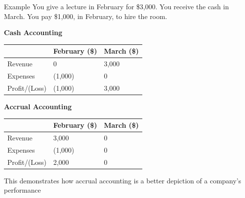 \documentclass{article}
\begin{document}
			\begin{question}{Example}
				You give a lecture in February for \$3,000. You receive the cash in March. You pay \$1,000, in February, to hire the room.

				\textbf{Cash Accounting}
				\begin{table}[H]
					\begin{center}
						\begin{tabular}[c]{p{3cm}|p{4cm}|p{4cm}}
							\hline
							\multicolumn{1}{c|}{\textbf{}} & 
							\multicolumn{1}{c|}{\textbf{February (\$)}} & 
							\multicolumn{1}{c}{\textbf{March (\$)}} \\
							\hline
							Revenue 	& 0			& 3,000 	\\
							Expenses	& (1,000)	& 0		\\
							\hline
							Profit/(Loss) & (1,000)	& 3,000 \\
							\hline
						\end{tabular}
					\end{center}
				\end{table}
				
				\textbf{Accrual Accounting}
				\begin{table}[H]
					\begin{center}
						\begin{tabular}[c]{p{3cm}|p{4cm}|p{4cm}}
							\hline
							\multicolumn{1}{c|}{\textbf{}} & 
							\multicolumn{1}{c|}{\textbf{February (\$)}} & 
							\multicolumn{1}{c}{\textbf{March (\$)}} \\
							\hline
							Revenue 	& 3,000			& 0 	\\
							Expenses	& (1,000)	& 0		\\
							\hline
							Profit/(Loss) & 2,000	& 0 \\
							\hline
						\end{tabular}
					\end{center}
				\end{table}

				This demonstrates how accrual accounting is a better depiction of a company's performance

			\end{question}
\end{document}
